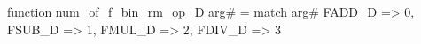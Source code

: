 function num_of_f_bin_rm_op_D arg# = match arg# {
  FADD_D => 0,
  FSUB_D => 1,
  FMUL_D => 2,
  FDIV_D => 3
}
